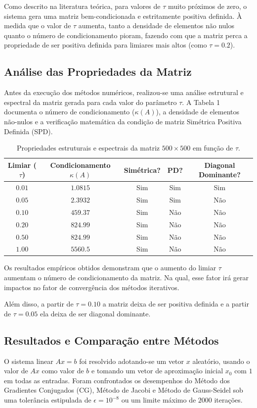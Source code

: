 \documentclass[12pt,a4paper]{article}
\begin{document}
Como descrito na literatura teórica, para valores de $\tau$ muito próximos de zero, o sistema gera uma matriz bem-condicionada e estritamente positiva definida. À medida que o valor de $\tau$ aumenta, tanto a densidade de elementos não nulos quanto o número de condicionamento pioram, fazendo com que a matriz perca a propriedade de ser positiva definida para limiares mais altos (como $\tau = 0.2$).

\subsection{Análise das Propriedades da Matriz}
Antes da execução dos métodos numéricos, realizou-se uma análise estrutural e espectral da matriz gerada para cada valor do parâmetro $\tau$. A Tabela 1 documenta o número de condicionamento ($\kappa(A)$), a densidade de elementos não-nulos e a verificação matemática da condição de matriz Simétrica Positiva Definida (SPD).

\begin{table}[H]
\centering
\caption{Propriedades estruturais e espectrais da matriz $500 \times 500$ em função de $\tau$.}
\label{tab:propriedades_matriz}
\vspace{2mm}
\begin{tabular}{ccccc}
\toprule
\textbf{Limiar ($\tau$)} & \textbf{Condicionamento $\kappa(A)$} & \textbf{Simétrica?} & \textbf{PD?}  & \textbf{Diagonal Dominante?} \\
\midrule
$0.01$ & $1.0815$ & Sim & Sim & Sim\\
$0.05$ & $2.3932$ & Sim & Sim & Não \\
$0.10$ & $459.37$ & Sim & Não & Não \\
$0.20$ & $824.99$  & Sim & Não & Não \\
$0.50$ & $824.99$  & Sim & Não & Não \\
$1.00$ & $5560.5$  & Sim & Não & Não \\
\bottomrule
\end{tabular}
\end{table}

Os resultados empíricos obtidos demonstram que o aumento do limiar $\tau$ aumentam o número de condicionamento da matriz. Na qual, esse fator irá gerar impactos no fator de convergência dos métodos iterativos.

Além disso, a partir de $\tau = 0.10$ a matriz deixa de ser positiva definida e a partir de $\tau = 0.05$ ela deixa de ser diagonal dominante.

\subsection{Resultados e Comparação entre Métodos}
O sistema linear $Ax = b$ foi resolvido adotando-se um vetor $x$ aleatório, usando o valor de $Ax$ como valor de $b$ e tomando um vetor de aproximação inicial $x_0$ com $1$ em todas as entradas. Foram confrontados os desempenhos do Método dos Gradientes Conjugados (CG), Método de Jacobi e Método de Gauss-Seidel sob uma tolerância estipulada de $\epsilon = 10^{-8}$ ou um limite máximo de $2000$ iterações. 
\end{document}
